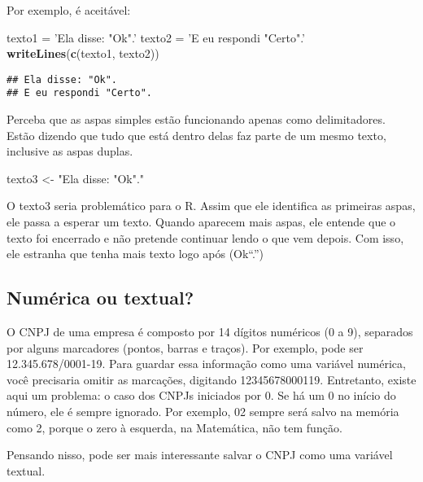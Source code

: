 \documentclass[
]{book}
\newenvironment{Shaded}{\begin{snugshade}}{\end{snugshade}}
\newcommand{\KeywordTok}[1]{\textcolor[rgb]{0.13,0.29,0.53}{\textbf{#1}}}
\newcommand{\NormalTok}[1]{#1}
\newcommand{\StringTok}[1]{\textcolor[rgb]{0.31,0.60,0.02}{#1}}
\begin{document}
Por exemplo, é aceitável:

\begin{Shaded}
\begin{Highlighting}[]
\NormalTok{texto1 =}\StringTok{ 'Ela disse: "Ok".'}
\NormalTok{texto2 =}\StringTok{ 'E eu respondi "Certo".'}
\KeywordTok{writeLines}\NormalTok{(}\KeywordTok{c}\NormalTok{(texto1, texto2))}
\end{Highlighting}
\end{Shaded}

\begin{verbatim}
## Ela disse: "Ok".
## E eu respondi "Certo".
\end{verbatim}

Perceba que as aspas simples estão funcionando apenas como delimitadores. Estão dizendo que tudo que está dentro delas faz parte de um mesmo texto, inclusive as aspas duplas.

\begin{Shaded}
\begin{Highlighting}[]
\NormalTok{texto3 <-}\StringTok{ "Ela disse: "}\NormalTok{Ok}\StringTok{"."}
\end{Highlighting}
\end{Shaded}

O texto3 seria problemático para o R. Assim que ele identifica as primeiras aspas, ele passa a esperar um texto. Quando aparecem mais aspas, ele entende que o texto foi encerrado e não pretende continuar lendo o que vem depois. Com isso, ele estranha que tenha mais texto logo após (Ok``.'')

\hypertarget{numuxe9rica-ou-textual}{%
\subsection{Numérica ou textual?}\label{numuxe9rica-ou-textual}}

O CNPJ de uma empresa é composto por 14 dígitos numéricos (0 a 9), separados por alguns marcadores (pontos, barras e traços). Por exemplo, pode ser 12.345.678/0001-19. Para guardar essa informação como uma variável numérica, você precisaria omitir as marcações, digitando 12345678000119. Entretanto, existe aqui um problema: o caso dos CNPJs iniciados por 0. Se há um 0 no início do número, ele é sempre ignorado. Por exemplo, 02 sempre será salvo na memória como 2, porque o zero à esquerda, na Matemática, não tem função.

Pensando nisso, pode ser mais interessante salvar o CNPJ como uma variável textual.
\end{document}
